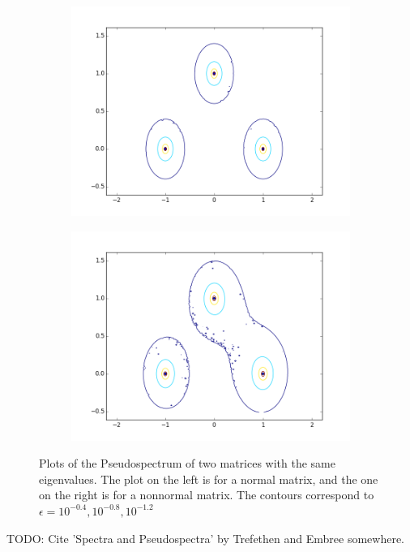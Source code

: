 \begin{figure}
\begin{center}
\begin{subfigure}[b]{.49\textwidth}
\centering
\includegraphics[width=\textwidth]{ps_normal}
\end{subfigure}
\begin{subfigure}[b]{.49\textwidth}
\centering
\includegraphics[width=\textwidth]{ps_nonnormal}
\end{subfigure}
\caption{Plots of the Pseudospectrum of two matrices with the same eigenvalues. The plot on the left is for a normal matrix, and the one on the right is for a nonnormal matrix. The contours correspond to $\epsilon=10^{-0.4},10^{-0.8},10^{-1.2}$}
\label{fig:ps_normal}
\end{center}
\end{figure}

TODO: Cite 'Spectra and Pseudospectra' by Trefethen and Embree somewhere.



